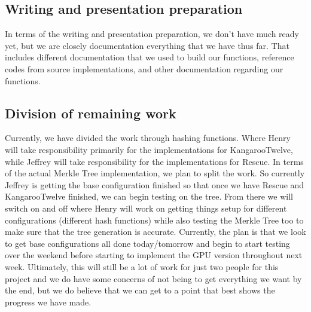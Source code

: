 \documentclass[conference]{IEEEtran}
\begin{document}
\subsection{Writing and presentation preparation}

In terms of the writing and presentation preparation, we don't have much ready yet, but we are closely documentation everything that we have thus far. That includes different documentation that we used to build our functions, reference codes from source implementations, and other documentation regarding our functions. 

\subsection{Division of remaining work}

Currently, we have divided the work through hashing functions. Where Henry will take responsibility primarily for the implementations for KangarooTwelve, while Jeffrey will take responsibility for the implementations for Rescue. In terms of the actual Merkle Tree implementation, we plan to split the work. So currently Jeffrey is getting the base configuration finished so that once we have Rescue and KangarooTwelve finished, we can begin testing on the tree. From there we will switch on and off where Henry will work on getting things setup for different configurations (different hash functions) while also testing the Merkle Tree too to make sure that the tree generation is accurate. Currently, the plan is that we look to get base configurations all done today/tomorrow and begin to start testing over the weekend before starting to implement the GPU version throughout next week. Ultimately, this will still be a lot of work for just two people for this project and we do have some concerns of not being to get everything we want by the end, but we do believe that we can get to a point that best shows the progress we have made.
\end{document}
